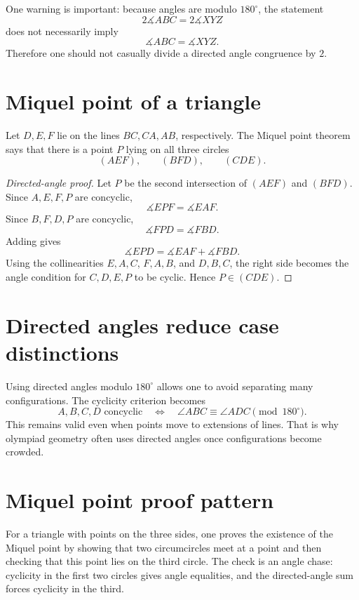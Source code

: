 One warning is important: because angles are modulo \(180^\circ\), the statement
\[
  2\measuredangle ABC=2\measuredangle XYZ
\]
does not necessarily imply
\[
  \measuredangle ABC=\measuredangle XYZ.
\]
Therefore one should not casually divide a directed angle congruence by \(2\).

\section{Miquel point of a triangle}

Let \(D,E,F\) lie on the lines \(BC,CA,AB\), respectively.  The Miquel point theorem says that there is a point \(P\) lying on all three circles
\[
  (AEF),\qquad (BFD),\qquad (CDE).
\]

\begin{proof}[Directed-angle proof]
Let \(P\) be the second intersection of \((AEF)\) and \((BFD)\).  Since \(A,E,F,P\) are concyclic,
\[
  \measuredangle EPF=\measuredangle EAF.
\]
Since \(B,F,D,P\) are concyclic,
\[
  \measuredangle FPD=\measuredangle FBD.
\]
Adding gives
\[
  \measuredangle EPD
  =
  \measuredangle EAF+\measuredangle FBD.
\]
Using the collinearities \(E,A,C\), \(F,A,B\), and \(D,B,C\), the right side becomes the angle condition for \(C,D,E,P\) to be cyclic.  Hence \(P\in(CDE)\).
\end{proof}


\section{Directed angles reduce case distinctions}

Using directed angles modulo \(180^\circ\) allows one to avoid separating many configurations.  The cyclicity criterion becomes
\[
  A,B,C,D\text{ concyclic}\quad\Longleftrightarrow\quad
  \angle ABC\equiv\angle ADC\pmod{180^\circ}.
\]
This remains valid even when points move to extensions of lines.  That is why olympiad geometry often uses directed angles once configurations become crowded.

\section{Miquel point proof pattern}

For a triangle with points on the three sides, one proves the existence of the Miquel point by showing that two circumcircles meet at a point and then checking that this point lies on the third circle.  The check is an angle chase: cyclicity in the first two circles gives angle equalities, and the directed-angle sum forces cyclicity in the third.

